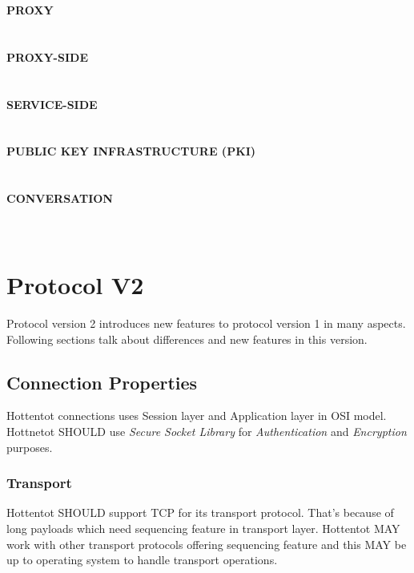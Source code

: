 \documentclass[10pt,a4paper]{article}
\begin{document}
  \textbf {PROXY} \\  \\\\
  \textbf {PROXY-SIDE} \\  \\\\
  \textbf {SERVICE-SIDE} \\  \\\\
  \textbf{PUBLIC KEY INFRASTRUCTURE (PKI)} \\  \\\\
  \textbf{CONVERSATION} \\  \\\\


\section{Protocol V2}
Protocol version 2 introduces new features to protocol version 1 in many aspects. Following sections talk about differences and new features in this version.

\subsection{Connection Properties}
Hottentot connections uses Session layer and Application layer in OSI model. Hottnetot SHOULD use \textit {Secure Socket Library} for \textit{Authentication} and \textit{Encryption} purposes.

\subsubsection{Transport}
Hottentot SHOULD support TCP for its transport protocol. That's because of long payloads which need sequencing feature in transport layer. Hottentot MAY work with other transport protocols offering sequencing feature and this MAY be up to operating system to handle transport operations.
\end{document}
